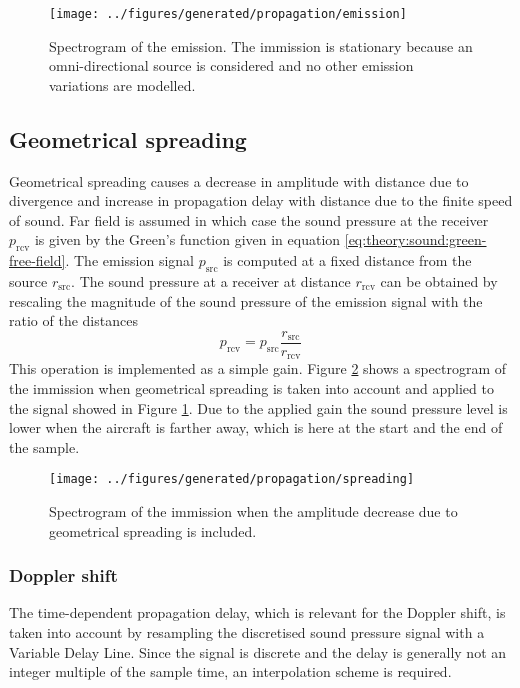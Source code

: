 
\begin{figure}[H]
  \centering
  \texttt{[image: ../figures/generated/propagation/emission]}
  \caption{Spectrogram of the emission. The immission is stationary because an omni-directional source is considered and no other emission variations are modelled.}
  \label{fig:implementation:propagation:emission}
\end{figure}


\newpage
\subsection{Geometrical spreading}
Geometrical spreading causes a decrease in amplitude with distance due to
divergence and increase in propagation delay with distance due to the finite
speed of sound. Far field is assumed in which case the sound pressure at the
receiver $p_{\mathrm{rcv}}$ is given by the Green's function given in equation
\eqref{eq:theory:sound:green-free-field}. The emission signal $p_{\mathrm{src}}$
is computed at a fixed distance from the source $r_{\mathrm{src}}$. The sound
pressure at a receiver at distance $r_{\mathrm{rcv}}$ can be obtained by
rescaling the magnitude of the sound pressure of the emission signal with the
ratio of the distances
\begin{equation}
 p_{\mathrm{rcv}} = p_{\mathrm{src}} \frac{r_{\mathrm{src}}}{r_{\mathrm{rcv}}}
\end{equation}
This operation is implemented as a simple gain. Figure
\ref{fig:implementation:propagation:spreading} shows a spectrogram of the
immission when geometrical spreading is taken into account and applied to the
signal showed in Figure \ref{fig:implementation:propagation:emission}. Due to
the applied gain the sound pressure level is lower when the aircraft is farther
away, which is here at the start and the end of the sample.

\begin{figure}[H]
  \centering
  \texttt{[image: ../figures/generated/propagation/spreading]}
  \caption{Spectrogram of the immission when the amplitude decrease due to geometrical spreading is included.}
  \label{fig:implementation:propagation:spreading}
\end{figure}

\subsubsection{Doppler shift}
The time-dependent propagation delay, which is relevant for the Doppler shift,
is taken into account by resampling the discretised sound pressure signal with a
Variable Delay Line. Since the signal is discrete and the delay is generally not
an integer multiple of the sample time, an interpolation scheme is required.


